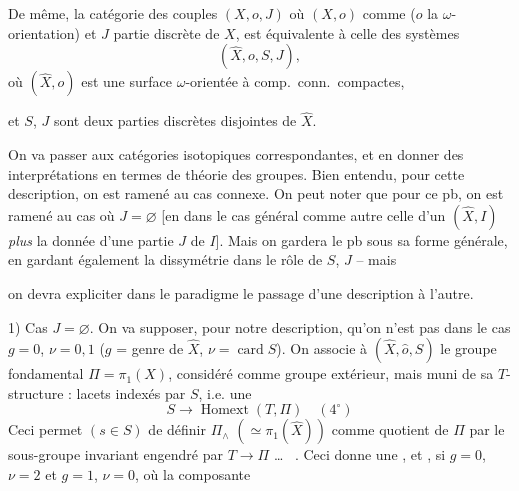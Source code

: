 \documentclass[11pt,a4paper]{article}
\begin{document}
De même, la catégorie des couples  $(X, o, J)$ où
$(X, o)$ comme  ($o$ la $\omega$-orientation) et $J$ partie
discrète de $X$, est équivalente à celle des systèmes
\[
  (\hat{X}, o, S, J),
\]
où $(\hat{X}, o)$ est une surface $\omega$-orientée à comp.\ conn.\ compactes,

et $S$, $J$ sont deux parties discrètes disjointes de $\hat{X}$.

On va passer aux catégories isotopiques correspondantes, et en donner des
interprétations en termes de théorie des groupes. Bien entendu, pour cette
description, on est ramené au cas connexe. On peut  noter
 que pour ce pb, on est ramené au cas où
$J = \varnothing$ [en   dans le cas général
comme autre  celle d'un $(\hat{X}, I)$ \emph{plus} la donnée
d'une partie $J$ de $I$]. Mais on gardera le pb sous sa forme générale, en
gardant également la dissymétrie dans le rôle de $S$, $J$ -- mais

on devra expliciter dans le paradigme le passage d'une description à
l'autre.

 

1) Cas $J = \varnothing$. On va supposer, pour notre description, qu'on
n'est pas dans le cas $g = 0$, $\nu = 0, 1$
($g$ = genre de $\hat{X}$, $\nu = \operatorname{card} S$).
On associe à $(\hat{X}, \hat{o}, S)$  le groupe
fondamental $\Pi = \pi_1(X)$, considéré comme groupe extérieur, mais muni de
sa $T$-structure :  lacets indexés par $S$, i.e. une
 
\[
  S \longrightarrow \operatorname{Homext}(T, \Pi) \quad (4^{\circ})
\]
Ceci permet \struck{\ill{}} $(s \in S)$ de définir
$\Pi_{\wedge}$ $(\simeq \pi_1(\hat{X}))$ comme quotient de $\Pi$ par le
sous-groupe invariant engendré par 
$T \to \Pi$ \ill{} \ldots\ 
\ill{}.
Ceci donne une \ill{}
\struck{\ill{}} , et \ill{} ,
 si $g = 0$, $\nu = 2$ et $g = 1$, $\nu = 0$, où
la composante  \ill{}
\end{document}
